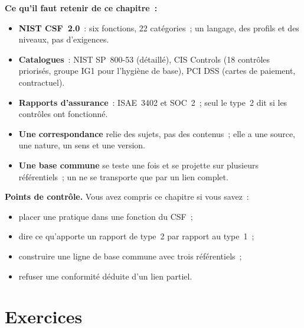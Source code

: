 \begin{boxresume}
\textbf{Ce qu'il faut retenir de ce chapitre~:}
\begin{itemize}
    \item \textbf{NIST CSF~2.0}~: six fonctions, 22 catégories~; un langage,
          des profils et des niveaux, pas d'exigences.
    \item \textbf{Catalogues}~: NIST SP~800-53 (détaillé), CIS Controls (18
          contrôles priorisés, groupe IG1 pour l'hygiène de base), PCI DSS
          (cartes de paiement, contractuel).
    \item \textbf{Rapports d'assurance}~: ISAE~3402 et SOC~2~; seul le
          type~2 dit si les contrôles ont fonctionné.
    \item \textbf{Une correspondance} relie des sujets, pas des
          contenus~; elle a une source, une nature, un sens et une
          version.
    \item \textbf{Une base commune} se teste une fois et se projette sur
          plusieurs référentiels~; un \OUI{} ne se transporte que par un
          lien complet.
\end{itemize}
\end{boxresume}

\begin{boxinfo}
\textbf{Points de contrôle.} Vous avez compris ce chapitre si vous savez~:
\begin{itemize}
    \item placer une pratique dans une fonction du CSF~;
    \item dire ce qu'apporte un rapport de type~2 par rapport au type~1~;
    \item construire une ligne de base commune avec trois référentiels~;
    \item refuser une conformité déduite d'un lien partiel.
\end{itemize}
\end{boxinfo}

\section*{Exercices}

